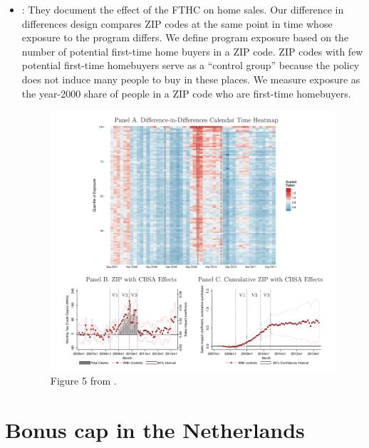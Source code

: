 \documentclass[12pt]{article}
\begin{document}
\begin{itemize}	
	\item \citet{berger2020stimulating}: They document the effect of the FTHC on home sales. Our difference in differences design compares ZIP codes at the same point in time whose
	exposure to the program differs. We define program exposure based on the number of potential first-time home buyers in a ZIP code. ZIP codes with few potential first-time homebuyers serve as a “control group” because the policy does not induce many people to buy in these places. We measure exposure as
	the year-2000 share of people in a ZIP code who are first-time homebuyers. 
	
	\begin{figure}[H]
		\centering
		\caption{Figure 5 from \citet{berger2020stimulating}.}
		\includegraphics[width=0.7\linewidth]{figure5_empirical_approach}
		
		\label{fig:figure5empiricalapproach}
	\end{figure}
	
\end{itemize}



\newpage
\section{Bonus cap in the Netherlands} \label{bonus_cap}
\end{document}
